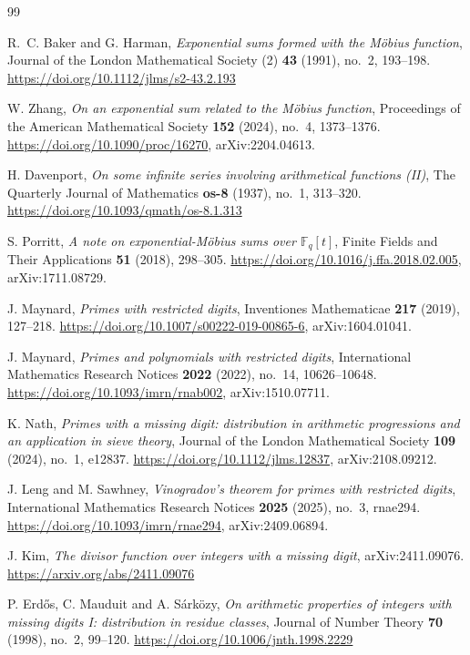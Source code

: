 \documentclass[11pt]{amsart}
\theoremstyle{definition}
\theoremstyle{remark}
\begin{document}
\begin{thebibliography}{99}

R.~C. Baker and G. Harman, \emph{Exponential sums formed with the M\"obius function}, Journal of the London Mathematical Society (2) \textbf{43} (1991), no.~2, 193--198. \url{https://doi.org/10.1112/jlms/s2-43.2.193}

W. Zhang, \emph{On an exponential sum related to the M\"obius function}, Proceedings of the American Mathematical Society \textbf{152} (2024), no.~4, 1373--1376. \url{https://doi.org/10.1090/proc/16270}, arXiv:2204.04613.

H. Davenport, \emph{On some infinite series involving arithmetical functions (II)}, The Quarterly Journal of Mathematics \textbf{os-8} (1937), no.~1, 313--320. \url{https://doi.org/10.1093/qmath/os-8.1.313}

S. Porritt, \emph{A note on exponential-M\"obius sums over $\mathbb F_q[t]$}, Finite Fields and Their Applications \textbf{51} (2018), 298--305. \url{https://doi.org/10.1016/j.ffa.2018.02.005}, arXiv:1711.08729.

J. Maynard, \emph{Primes with restricted digits}, Inventiones Mathematicae \textbf{217} (2019), 127--218. \url{https://doi.org/10.1007/s00222-019-00865-6}, arXiv:1604.01041.

J. Maynard, \emph{Primes and polynomials with restricted digits}, International Mathematics Research Notices \textbf{2022} (2022), no.~14, 10626--10648. \url{https://doi.org/10.1093/imrn/rnab002}, arXiv:1510.07711.

K. Nath, \emph{Primes with a missing digit: distribution in arithmetic progressions and an application in sieve theory}, Journal of the London Mathematical Society \textbf{109} (2024), no.~1, e12837. \url{https://doi.org/10.1112/jlms.12837}, arXiv:2108.09212.

J. Leng and M. Sawhney, \emph{Vinogradov's theorem for primes with restricted digits}, International Mathematics Research Notices \textbf{2025} (2025), no.~3, rnae294. \url{https://doi.org/10.1093/imrn/rnae294}, arXiv:2409.06894.

J. Kim, \emph{The divisor function over integers with a missing digit}, arXiv:2411.09076. \url{https://arxiv.org/abs/2411.09076}

P. Erd\H{o}s, C. Mauduit and A. S\'ark\"ozy, \emph{On arithmetic properties of integers with missing digits I: distribution in residue classes}, Journal of Number Theory \textbf{70} (1998), no.~2, 99--120. \url{https://doi.org/10.1006/jnth.1998.2229}


\end{thebibliography}
\end{document}
